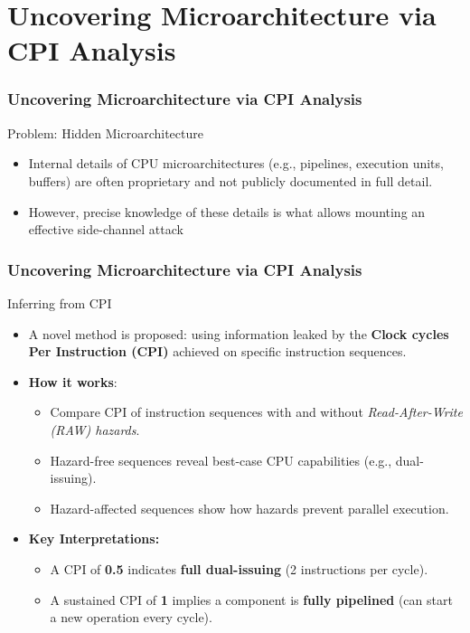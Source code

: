 
\section{Uncovering Microarchitecture via CPI Analysis}






\begin{frame}
    \frametitle{Uncovering Microarchitecture via CPI Analysis}
    \begin{block}{Problem: Hidden Microarchitecture}
        \begin{itemize}
            \item Internal details of CPU microarchitectures (e.g., pipelines, execution units, buffers) are often proprietary and not publicly documented in full detail.
            \item However, precise knowledge of these details is what allows mounting an effective side-channel attack
        \end{itemize}
    \end{block}
\end{frame}

\begin{frame}
    \frametitle{Uncovering Microarchitecture via CPI Analysis}
    \begin{block}{Inferring from CPI}
        \begin{itemize}
            \item A novel method is proposed: using information leaked by the \textbf{Clock cycles Per Instruction (CPI)} achieved on specific instruction sequences.
            \item \textbf{How it works}:
                \begin{itemize}
                    \item Compare CPI of instruction sequences with and without \textit{Read-After-Write (RAW) hazards}.
                    \item Hazard-free sequences reveal best-case CPU capabilities (e.g., dual-issuing).
                    \item Hazard-affected sequences show how hazards prevent parallel execution.
                \end{itemize}
            \item \textbf{Key Interpretations:}
                \begin{itemize}
                    \item A CPI of \textbf{0.5} indicates \textbf{full dual-issuing} (2 instructions per cycle).
                    \item A sustained CPI of \textbf{1} implies a component is \textbf{fully pipelined} (can start a new operation every cycle).
                \end{itemize}
        \end{itemize}
    \end{block}
\end{frame}

